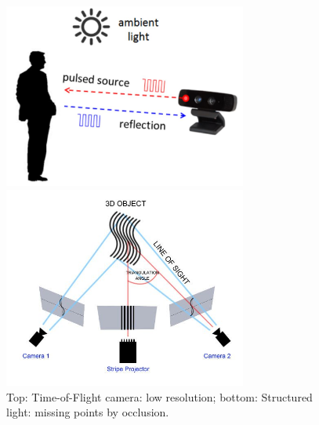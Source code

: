 \begin{figure}[htb]
\begin{minipage}[b]{0.95\linewidth}
  \centering
  \centerline{\includegraphics[width=8cm]{depth_interp/misc/tof_camera.JPG}}
\end{minipage}
\vfill
\begin{minipage}[b]{0.95\linewidth}
  \centering
  \centerline{\includegraphics[width=8cm]{depth_interp/misc/structure_light.jpg}}
\end{minipage}
\vfill
\caption{Top: Time-of-Flight camera: low resolution; bottom: Structured light: missing points by occlusion.}
\label{fig1:camera}
\end{figure}


